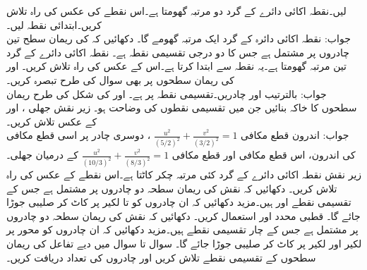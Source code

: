 \quad
{} لیں۔نقطہ  اکائی دائرے کے گرد دو مرتبہ گھومتا ہے۔اس نقطے کی عکس کی راہ تلاش کریں۔ابتدائی نقطہ  لیں۔\\
جواب:\quad
نقطہ  اکائی دائرہ  کے گرد ایک مرتبہ گھومے گا۔
\quad
دکھائیں کہ  کی ریمان سطح تین چادروں پر مشتمل ہے جس کا دو درجی تقسیمی نقطہ  ہے۔ نقطہ  اکائی دائرے کے گرد تین مرتبہ گھومتا ہے۔یہ نقطہ  سے ابتدا کرتا ہے۔اس کے عکس کی راہ تلاش کریں۔
\quad
{} اور  کی ریمان سطحوں  پر بھی سوال  کی طرح تبصرہ کریں۔\\
جواب:\quad
بالترتیب  اور  چادریں۔تقسیمی نقطہ  پر ہے۔
\quad
{} اور  کی شکل  کی طرح  ریمان سطحوں کا خاکہ بنائیں جن میں تقسیمی نقطوں کی وضاحت ہو۔
\quad
زیر نقش  جھلی ،  اور  کے عکس تلاش کریں۔\\
جواب:\quad
اندرون قطع مکافی 
$\tfrac{u^2}{(5/2)^2}+\tfrac{v^2}{(3/2)^2}=1$
، دوسری چادر پر اسی قطع مکافی کی اندرون، اس قطع مکافی اور قطع مکافی 
$\tfrac{u^2}{(10/3)^2}+\tfrac{v^2}{(8/3)^2}=1$
کے درمیان جھلی۔
\quad
زیر نقش  نقطہ  اکائی دائرے کے گرد کئی مرتبہ چکر کاٹتا ہے۔اس نقطے کے عکس کی راہ تلاش کریں۔
\quad
دکھائیں کہ نقش   کی ریمان سطحہ دو چادروں پر مشتمل ہے  جس  کے تقسیمی نقطے  اور  ہیں۔مزید دکھائیں کہ ان چادروں کو  تا  لکیر پر کاٹ کر صلیبی جوڑا جائے گا۔ قطبی محدد  اور  استعمال کریں۔
\quad
دکھائیں کہ نقش   کی ریمان سطحہ دو چادروں پر مشتمل ہے  جس  کے چار تقسیمی نقطے ہیں۔مزید دکھائیں کہ ان چادروں کو  محور پر لکیر     اور لکیر  پر کاٹ کر صلیبی جوڑا جائے گا۔
سوال  تا سوال  میں دیے تفاعل کی ریمان سطحوں  کے تقسیمی نقطے تلاش کریں اور چادروں کی تعداد دریافت کریں۔ 

